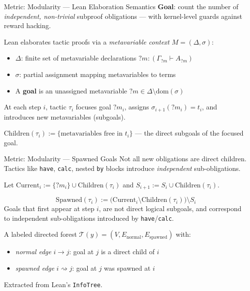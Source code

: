 \begin{frame}{Metric: Modularity --- Lean Elaboration Semantics}
\vspace{0.3em}
\textbf{Goal}: count the number of \emph{independent, non-trivial} subproof obligations --- with kernel-level guards against reward hacking.
\vspace{0.4em}

Lean elaborates tactic proofs via a \emph{metavariable context} $M = (\Delta, \sigma)$:
\begin{itemize}\setlength{\itemsep}{4pt}
  \item $\Delta$: finite set of metavariable declarations $?m : (\Gamma_{?m} \vdash A_{?m})$
  \item $\sigma$: partial assignment mapping metavariables to terms
  \item A \textbf{goal} is an unassigned metavariable $?m \in \Delta \setminus \mathrm{dom}(\sigma)$
\end{itemize}
\vspace{0.4em}
At each step $i$, tactic $\tau_i$ focuses goal $?m_i$, assigns $\sigma_{i+1}(?m_i) = t_i$, and introduces new metavariables (subgoals).
\vspace{0.4em}
\begin{definition}
$\mathrm{Children}(\tau_i) := \{\text{metavariables free in } t_i\}$ --- the direct subgoals of the focused goal.
\end{definition}
\end{frame}

\begin{frame}{Metric: Modularity --- Spawned Goals}
\vspace{0.4em}
Not all new obligations are direct children. Tactics like \texttt{have}, \texttt{calc}, nested \texttt{by} blocks introduce \emph{independent} sub-obligations.
\vspace{0.4em}

Let $\mathrm{Current}_i := \{?m_i\} \cup \mathrm{Children}(\tau_i)$ and $S_{i+1} := S_i \cup \mathrm{Children}(\tau_i)$.
\vspace{0.4em}
\begin{definition}
\[
  \mathrm{Spawned}(\tau_i) := \bigl(\mathrm{Current}_i \setminus \mathrm{Children}(\tau_i)\bigr) \setminus S_i
\]
Goals that first appear at step $i$, are not direct logical subgoals, and correspond to independent sub-obligations introduced by \texttt{have}/\texttt{calc}.
\end{definition}
\vspace{0.4em}
\begin{definition}
A labeled directed forest $\mathcal{T}(y) = (V, E_{\mathrm{normal}}, E_{\mathrm{spawned}})$ with:
\begin{itemize}\setlength{\itemsep}{2pt}
  \item \emph{normal edge} $i \to j$: goal at $j$ is a direct child of $i$
  \item \emph{spawned edge} $i \rightsquigarrow j$: goal at $j$ was spawned at $i$
\end{itemize}
Extracted from Lean's \texttt{InfoTree}.
\end{definition}
\end{frame}

